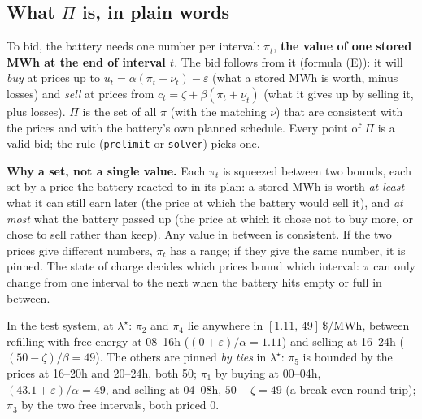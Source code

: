 \documentclass[10pt,a4paper]{article}
\newcommand{\code}[1]{\texttt{#1}}
\newcommand{\lamstar}{\lambda^{\star}}
\newcommand{\lamhat}{\hat\lambda}
\newcommand{\nuU}{\bar\nu}
\newcommand{\nuL}{\underline\nu}
\begin{document}
\subsection{What $\Pi$ is, in plain words}
To bid, the battery needs one number per interval: $\pi_t$, \textbf{the value of one stored MWh at the end
of interval $t$}. The bid follows from it (formula (E)): it will \emph{buy} at prices up to
$u_t=\alpha(\pi_t-\nuU_t)-\varepsilon$ (what a stored MWh is worth, minus losses) and \emph{sell} at prices
from $c_t=\zeta+\beta(\pi_t+\nuL_t)$ (what it gives up by selling it, plus losses). $\Pi$ is the set of all
$\pi$ (with the matching $\nu$) that are consistent with the prices and with the battery's own planned
schedule. Every point of $\Pi$ is a valid bid; the rule (\code{prelimit} or \code{solver}) picks one.
\begin{center}
\end{center}
\textbf{Why a set, not a single value.} Each $\pi_t$ is squeezed between two bounds, each set by a price
the battery reacted to in its plan: a stored MWh is worth \emph{at least} what it can still earn later (the
price at which the battery would sell it), and \emph{at most} what the battery passed up (the price at which it
chose not to buy more, or chose to sell rather than keep). Any value in between is consistent. If the two
prices give different numbers, $\pi_t$ has a range; if they give the same number, it is pinned. The state of
charge decides which prices bound which interval: $\pi$ can only change from one interval to the next when
the battery hits empty or full in between.

In the test system, at $\lamstar$: $\pi_2$ and $\pi_4$ lie anywhere in $[1.11,\,49]$\,\$/MWh, between refilling
with free energy at 08--16h ($(0+\varepsilon)/\alpha=1.11$) and selling at 16--24h ($(50-\zeta)/\beta=49$).
The others are pinned \emph{by ties} in $\lamstar$: $\pi_5$ is bounded by the prices at 16--20h and
20--24h, both 50; $\pi_1$ by buying at 00--04h, $(43.1+\varepsilon)/\alpha=49$, and selling at 04--08h,
$50-\zeta=49$ (a break-even round trip); $\pi_3$ by the two free intervals, both priced 0.
\end{document}
